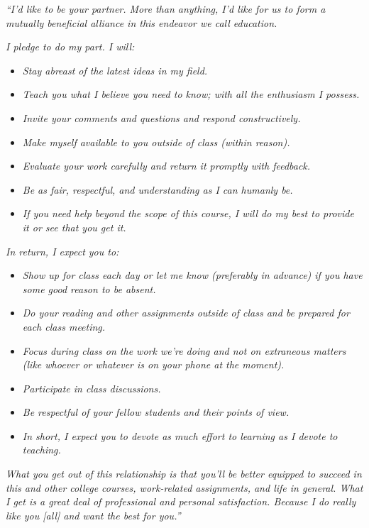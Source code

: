 \documentclass[
  11pt,
  letterpaper,
  DIV=11,
  numbers=noendperiod]{scrartcl}
\providecommand{\tightlist}{%
  \setlength{\itemsep}{0pt}\setlength{\parskip}{0pt}}\usepackage{longtable,booktabs,array}
\begin{document}
\emph{``I'd like to be your partner. More than anything, I'd like for us
to form a mutually beneficial alliance in this endeavor we call
education.}

\emph{I pledge to do my part. I will:}

\begin{itemize}
\tightlist
\item
  \emph{Stay abreast of the latest ideas in my field.}
\item
  \emph{Teach you what I believe you need to know; with all the
  enthusiasm I possess.}
\item
  \emph{Invite your comments and questions and respond constructively.}
\item
  \emph{Make myself available to you outside of class (within reason).}
\item
  \emph{Evaluate your work carefully and return it promptly with
  feedback.}
\item
  \emph{Be as fair, respectful, and understanding as I can humanly be.}
\item
  \emph{If you need help beyond the scope of this course, I will do my
  best to provide it or see that you get it.}
\end{itemize}

\emph{In return, I expect you to:}

\begin{itemize}
\tightlist
\item
  \emph{Show up for class each day or let me know (preferably in
  advance) if you have some good reason to be absent.}
\item
  \emph{Do your reading and other assignments outside of class and be
  prepared for each class meeting.}
\item
  \emph{Focus during class on the work we're doing and not on extraneous
  matters (like whoever or whatever is on your phone at the moment).}
\item
  \emph{Participate in class discussions.}
\item
  \emph{Be respectful of your fellow students and their points of view.}
\item
  \emph{In short, I expect you to devote as much effort to learning as I
  devote to teaching.}
\end{itemize}

\emph{What you get out of this relationship is that you'll be better
equipped to succeed in this and other college courses, work-related
assignments, and life in general. What I get is a great deal of
professional and personal satisfaction. Because I do really like you
{[}all{]} and want the best for you.''}
\end{document}

